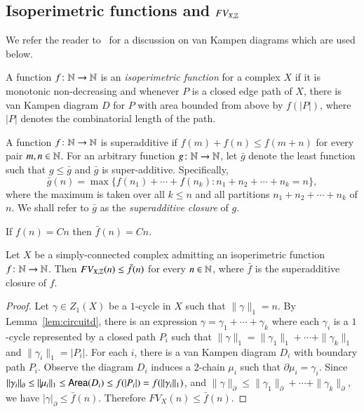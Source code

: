 \subsection{Isoperimetric functions and $FV_{X, \mathbb{Z}}$}

We refer the reader to~\cite[Appendix: Combinatorial 2-Complexes]{BrHa99} for a discussion on van Kampen diagrams which are used below.

 \begin{definition}
A function $f\colon \mathbb{N} \to \mathbb{N}$ is an \emph{isoperimetric function} for a complex $X$ if it is monotonic non-decreasing and whenever $P$ is a closed edge path  of $X$, there is van Kampen diagram $D$ for $P$ with area bounded from above by $f(|P|)$, where $|P|$ denotes the combinatorial length of the path. 
\end{definition}  
 
 \begin{definition}
 A function $f\colon \mathbb{N} \to \mathbb{N}$ is superadditive if $f(m)+f(n)\leq f(m+n)$ for every pair $m,n\in \mathbb{N}$. For an arbitrary function $g\colon \mathbb{N} \to \mathbb{N}$, let $\bar g$ denote the least function such that $g\leq \bar g$ and $\bar g$ is super-additive. Specifically, 
 \[\bar g(n) = \max \{f(n_1)+\cdots +f(n_k) \colon n_1+n_2+\cdots +n_k=n \},\]
 where the maximum is taken over all $k\leq n$ and all partitions $n_1+n_2+\cdots +n_k$ of $n$. We shall refer to $\bar g$ as the \emph{superadditive closure} of $g$.  
 \end{definition}

 \begin{remark}\label{rem:linearclosure}
If $f(n)=Cn$ then $\bar f (n) =Cn$.
\end{remark}
   
\begin{proposition}\cite[Proposition 2.4]{Ge99}\label{prop:finiteFV}
Let $X$ be a simply-connected complex admitting an isoperimetric function $f\colon \mathbb{N} \to \mathbb{N}$. Then $FV_{X, \mathbb{Z}}(n) \leq \bar f(n)$ for every $n\in \mathbb{N}$, where $\bar f$ is the superadditive closure of $f$.
\end{proposition}
\begin{proof}
Let  $\gamma \in Z_1(X)$ be a $1$-cycle in $X$ such that $\|\gamma\|_1=n$. By Lemma~\ref{lem:circuitd}, there is an expression   $\gamma=\gamma_1+\cdots+\gamma_k$ where each $\gamma_i$ is a $1$-cycle represented by  a closed path $P_i$ such that  $\|\gamma\|_1=\|\gamma_1\|_1+ \cdots + \|\gamma_k\|_1$ and $\|\gamma_i\|_1=|P_i|$.  For each $i$,  there is a van Kampen diagram $D_i$ with boundary path $P_i$. Observe  the diagram $D_i$ induces a $2$-chain $\mu_i$ such that  $\partial \mu_i =  \gamma_i$.  Since 
$\|\gamma_i\|_\partial \leq \|\mu_i\|_1 \leq \operatorname{\mathsf{Area}} (D_i) \leq f(|P_i|) = f(\|\gamma_i\|_1)$,  
and
$\|\gamma\|_\partial \leq \|\gamma_1\|_\partial+ \cdots + \|\gamma_k\|_\partial,$
we have  
$|\gamma|_\partial \leq \bar f(n)$. Therefore $FV_X(n) \leq \bar f(n)$.
\end{proof}

